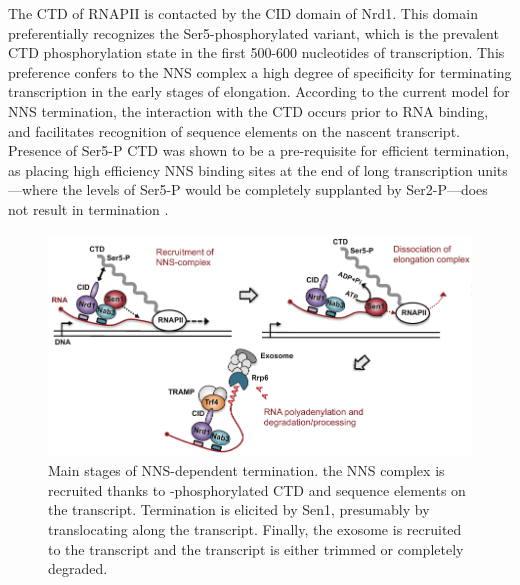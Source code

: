 The CTD of RNAPII is contacted by the CID domain of Nrd1. 
This domain preferentially recognizes the Ser5-phosphorylated variant, which is the prevalent CTD phosphorylation state in the first 500-600 nucleotides of transcription. 
This preference confers to the NNS complex a high degree of specificity for terminating transcription in the early stages of elongation. 
According to the current model for NNS termination, the interaction with the CTD occurs prior to RNA binding, and facilitates recognition of sequence elements on the nascent transcript.  
Presence of Ser5-P CTD was shown to be a pre-requisite for efficient termination, as placing high efficiency NNS binding sites at the end of long transcription units---where the levels of Ser5-P would be completely supplanted by Ser2-P---does not result in termination \cite{gudipati:2008:phosphorylation}.

\begin{figure}[ht]

\centering
\includegraphics[width=\textwidth]{figures/introduction/nns}
\caption[Mechanism of NNS termination]{Main stages of NNS-dependent termination. the NNS complex is recruited thanks to \serf{}-phosphorylated CTD and sequence elements on the transcript. Termination is elicited by Sen1, presumably by translocating along the transcript. Finally, the exosome is recruited to the transcript and the transcript is either trimmed or completely degraded.}
\label{fig:nnsTermination}

\end{figure}


